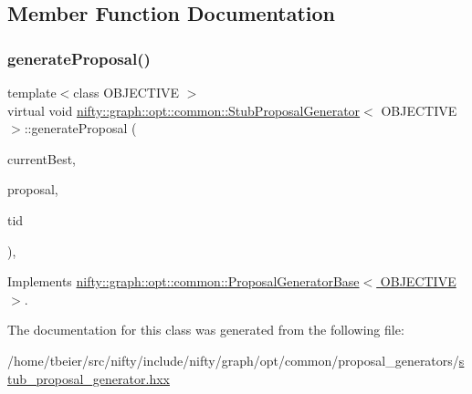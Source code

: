 \subsection{Member Function Documentation}
\mbox{\label{classnifty_1_1graph_1_1opt_1_1common_1_1StubProposalGenerator_a38c36aac9cf548bbc9871ccb865709d7}} 
\subsubsection{\texorpdfstring{generate\+Proposal()}{generateProposal()}}
{\footnotesize\ttfamily template$<$class O\+B\+J\+E\+C\+T\+I\+VE $>$ \\
virtual void \hyperlink{classnifty_1_1graph_1_1opt_1_1common_1_1StubProposalGenerator}{nifty\+::graph\+::opt\+::common\+::\+Stub\+Proposal\+Generator}$<$ O\+B\+J\+E\+C\+T\+I\+VE $>$\+::generate\+Proposal (\begin{DoxyParamCaption}\item[{const \hyperlink{classnifty_1_1graph_1_1opt_1_1common_1_1ProposalGeneratorBase_a122993da5c326628cdb865a6279d20c5}{Proposal\+Type} \&}]{current\+Best,  }\item[{\hyperlink{classnifty_1_1graph_1_1opt_1_1common_1_1ProposalGeneratorBase_a122993da5c326628cdb865a6279d20c5}{Proposal\+Type} \&}]{proposal,  }\item[{const size\+\_\+t}]{tid }\end{DoxyParamCaption})\hspace{0.3cm}{\ttfamily [inline]}, {\ttfamily [virtual]}}



Implements \hyperlink{classnifty_1_1graph_1_1opt_1_1common_1_1ProposalGeneratorBase_abb7b02d650049f52733b3f2dc81bb395}{nifty\+::graph\+::opt\+::common\+::\+Proposal\+Generator\+Base$<$ O\+B\+J\+E\+C\+T\+I\+V\+E $>$}.



The documentation for this class was generated from the following file\+:\begin{DoxyCompactItemize}
\item 
/home/tbeier/src/nifty/include/nifty/graph/opt/common/proposal\+\_\+generators/\hyperlink{stub__proposal__generator_8hxx}{stub\+\_\+proposal\+\_\+generator.\+hxx}\end{DoxyCompactItemize}
